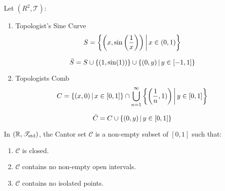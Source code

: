 \documentclass[letterpaper,12pt,fleqn]{article}
\newcommand{\T}{\mathscr{T}}
\renewcommand{\C}{\mathcal{C}}
\begin{document}
\begin{example}
  Let \((R^2,\T)\):

  \begin{enumerate}
    \item Topologist's Sine Curve
      \[S=\left\{{\left(x,\sin\left(\frac{1}{x}\right)\right)}\,\middle|\,{x\in(0,1)}\right\}\]

      \[\bar{S}=S\cup\{(1,\sin(1))\}\cup\left\{{(0,y)}\,\middle|\,{y\in[-1,1]}\right\}\]

    \item Topologists Comb
      \[C=\left\{{(x,0)}\,\middle|\,{x\in[0,1]}\right\}\cap\bigcup_{n=1}^{\infty}\left\{{\left(\frac{1}{n},1)\right)}\,\middle|\,{y\in[0,1]}\right\}\]

      \[\bar{C}=C\cup\left\{{(0,y)}\,\middle|\,{y\in[0,1]}\right\}\]
  \end{enumerate}
\end{example}

\begin{example}
  In \((\R,\T_{\text{std}})\), the Cantor set \(\C\) is a non-empty subset of \([0,1]\) such that:
  \begin{enumerate}
  \item \(\C\) is closed.
  \item \(\C\) contains no non-empty open intervals.
  \item \(\C\) contains no isolated points.
  \end{enumerate}
\end{example}
\end{document}
